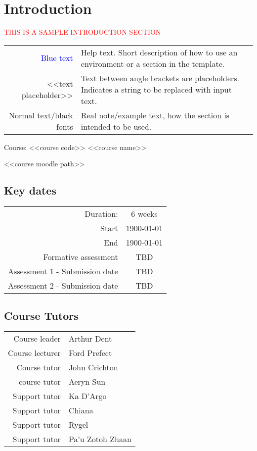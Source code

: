 \section{Introduction}

{\begin{center}
    \textcolor{red}{\Huge{THIS IS A SAMPLE INTRODUCTION SECTION}}

    \begin{tabular}{r @{: } p{80mm}}
        {\textcolor{blue}{Blue text}} &  Help text. Short description of how to use an environment or a section in the template.\\
        <<text placeholder>> & Text between angle brackets are placeholders. Indicates a string to be replaced with input text.\\
        Normal text/black fonts & Real note/example text, how the section is intended to be used.
    \end{tabular}

\end{center}


{\huge{Course: <<course code>> <<course name>>}}

<<course moodle path>>

\subsection{Key dates}

\begin{tabular}{r @{ : } c}
    Duration: & 6 weeks\\
    Start & 1900-01-01\\
    End & 1900-01-01\\
    Formative assessment & TBD\\
    Assessment 1 - Submission date & TBD\\
    Assessment 2 - Submission date & TBD\\
\end{tabular}

\subsection{Course Tutors}

\begin{tabular}{r @{ : } l}
    Course leader & Arthur Dent\\
    Course lecturer & Ford Prefect\\
    Course tutor & John Crichton\\
    course tutor & Aeryn Sun\\
    Support tutor & Ka D'Argo\\
    Support tutor & Chiana\\
    Support tutor& Rygel\\
    Support tutor & Pa'u Zotoh Zhaan\\
\end{tabular}

}
